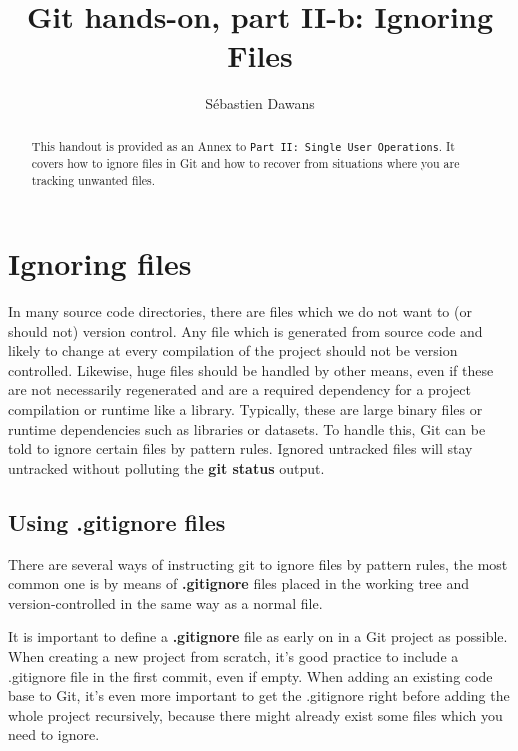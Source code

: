 \documentclass[a4paper]{../../common/tufte-latex/tufte-handout}
\title{Git hands-on, part II-b: Ignoring Files}
\author{S\'ebastien Dawans}
\begin{document}
\maketitle%

\tableofcontents

\begin{abstract}
\noindent
This handout is provided as an Annex to \texttt{Part II: Single User Operations}. It covers how to ignore files in Git and how to recover from situations where you are tracking unwanted files.
\end{abstract}

\section{Ignoring files}
\label{section:ignore}
In many source code directories, there are files which we do not want to (or should not) version control.
Any file which is generated from source code and likely to change at every compilation of the project should not be version controlled.
Likewise, huge files should be handled by other means, even if these are not necessarily regenerated and are a required dependency for a project compilation or runtime like a library.
Typically, these are large binary files or runtime dependencies such as libraries or datasets.
To handle this, Git can be told to ignore certain files by pattern rules.
Ignored untracked files will stay untracked without polluting the \textbf{git status} output.

\subsection{Using .gitignore files}
There are several ways of instructing git to ignore files by pattern rules, the most common one is by means of \textbf{.gitignore} files placed in the working tree and version-controlled in the same way as a normal file.

It is important to define a \textbf{.gitignore} file as early on in a Git project as possible.
When creating a new project from scratch, it's good practice to include a .gitignore file in the first commit, even if empty.
When adding an existing code base to Git, it's even more important to get the .gitignore right before adding the whole project recursively, because there might already exist some files which you need to ignore.
\end{document}
